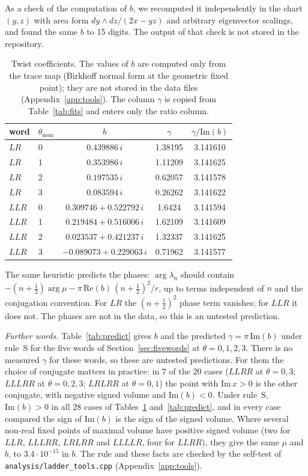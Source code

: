 \documentclass[11pt]{amsart}
\theoremstyle{definition}
\theoremstyle{remark}
\begin{document}
As a check of the computation of $b$, we recomputed it independently in the chart
$(y,z)$ with area form $dy\wedge dz/(2x - yz)$ and arbitrary eigenvector scalings, and
found the same $b$ to 15 digits. The output of that check is not stored in the
repository.

\begin{table}[ht]
\centering
\begin{tabular}{llccc}
\toprule
word & $\theta_{\mathrm{nom}}$ & $b$ & $\gamma$ & $\gamma/\mathrm{Im}(b)$ \\
\midrule
$LR$  & 0 & $0.439886\,i$ & 1.38195 & 3.141610 \\
$LR$  & 1 & $0.353986\,i$ & 1.11209 & 3.141625 \\
$LR$  & 2 & $0.197535\,i$ & 0.62057 & 3.141578 \\
$LR$  & 3 & $0.083594\,i$ & 0.26262 & 3.141622 \\
$LLR$ & 0 & $0.309746 + 0.522792\,i$ & 1.6424 & 3.141594 \\
$LLR$ & 1 & $0.219484 + 0.516006\,i$ & 1.62109 & 3.141609 \\
$LLR$ & 2 & $0.023537 + 0.421237\,i$ & 1.32337 & 3.141625 \\
$LLR$ & 3 & $-0.089073 + 0.229063\,i$ & 0.71962 & 3.141577 \\
\bottomrule
\end{tabular}
\caption{Twist coefficients. The values of $b$ are computed only from the trace map
(Birkhoff normal form at the geometric fixed point); they are not stored in the data
files (Appendix~\ref{app:tools}). The column $\gamma$ is copied from
Table~\ref{tab:fits} and enters only the ratio column.}
\label{tab:twist}
\end{table}

The same heuristic predicts the phases: $\arg\lambda_n$ should contain
$-(n+\frac12)\arg\mu - \pi\,\mathrm{Re}(b)\,(n+\frac12)^2/r$, up to terms independent
of $n$ and the conjugation convention. For $LR$ the $(n+\frac12)^2$ phase term
vanishes; for $LLR$ it does not. The phases are not in the data, so this is
an untested prediction.

\emph{Further words.} Table~\ref{tab:predict} gives $b$ and the predicted
$\gamma = \pi\,\mathrm{Im}(b)$ under rule~S for the five words of
Section~\ref{sec:fivewords} at $\theta = 0, 1, 2, 3$. There is no measured $\gamma$ for
these words, so these are untested predictions. For them the choice of conjugate
matters in practice: in $7$ of the $20$ cases ($LLRR$ at $\theta = 0, 3$; $LLLRR$ at
$\theta = 0, 2, 3$; $LRLRR$ at $\theta = 0, 1$) the point with $\mathrm{Im}\,x > 0$ is
the other conjugate, with negative signed volume and $\mathrm{Im}(b) < 0$. Under
rule~S, $\mathrm{Im}(b) > 0$ in all $28$ cases of Tables~\ref{tab:twist}
and~\ref{tab:predict}, and in every case compared the sign of $\mathrm{Im}(b)$ is the
sign of the signed volume. Where several non-real fixed points of maximal volume have
positive signed volume (two for $LLR$, $LLLRR$, $LRLRR$ and $LLLLR$, four for
$LLRR$), they give the same $\mu$ and $b$, to $3.4\cdot10^{-15}$ in $b$. The rule and
these facts are checked by the self-test of \texttt{analysis/ladder\_tools.cpp}
(Appendix~\ref{app:tools}).
\end{document}
